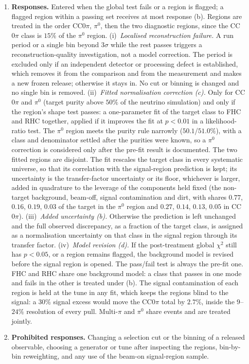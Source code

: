 \documentclass[11pt,a4paper]{article}
\begin{document}
\begin{enumerate}
    beyond $3\sigma$ with a passing total is examined for a reconstruction pathology but does not flag the
    region.
  \item \textbf{Responses.} Entered when the global test fails or a region is flagged; a flagged region
    within a passing set receives at most response (b). Regions are treated in the order CC$0\pi$,
    $\pi^0$, then the two diagnostic regions, since the CC$0\pi$ class is $15\%$ of the $\pi^0$ region.
    (i)~\emph{Localised reconstruction failure.} A run period or a single bin beyond $3\sigma$ while the
    rest passes triggers a reconstruction-quality investigation, not a model correction. The period is
    excluded only if an independent detector or processing defect is established, which removes it from
    the comparison and from the measurement and makes a new frozen release; otherwise it stays in. No cut
    or binning is changed and no single bin is removed.
    (ii)~\emph{Fitted normalisation correction (c).} Only for CC$0\pi$ and $\pi^0$ (target purity above
    $50\%$ of the neutrino simulation) and only if the region's shape test passes: a one-parameter fit of
    the target class to FHC and RHC together, applied if it improves the fit at $p<0.01$ in a
    likelihood-ratio test. The $\pi^0$ region meets the purity rule narrowly ($50.1$/$51.0\%$), with a
    class and denominator settled after the purities were known, so a $\pi^0$ correction is considered only
    after the pre-fit result is documented. The two fitted regions are disjoint. The fit rescales the
    target class in every systematic universe, so that its correlation with the signal-region prediction
    is kept; its uncertainty is the transfer-factor uncertainty or its floor, whichever is larger, added in
    quadrature to the leverage of the components held fixed (the non-target background, beam-off, signal
    contamination and dirt, with shares $0.77$, $0.16$, $0.19$, $0.03$ of the target in the $\pi^0$ region and
    $0.27$, $0.14$, $0.13$, $0.05$ in CC$0\pi$).
    (iii)~\emph{Added uncertainty (b).} Otherwise the prediction is left unchanged and the full observed
    discrepancy, as a fraction of the target class, is assigned as a normalisation uncertainty on that
    class in the signal region through its transfer factor.
    (iv)~\emph{Model revision (d).} If the post-treatment global $\chi^2$ still has $p<0.05$, or a region
    remains flagged, the background model is revised before the signal region is opened. The pass/fail
    test is always the pre-fit one.
    FHC and RHC share one background model: a class that passes in one mode and fails in the other is
    treated under (b). The signal contamination of each region is held at the tune in any fit, which keeps
    the regions blind to the signal: a $30\%$ signal excess would move the CC$0\pi$ total by $2.7\%$, inside
    the $9$--$24\%$ resolution of every pull. Multi-$\pi$ and $\pi^0$ share events and are treated jointly.
  \item \textbf{Prohibited responses.} Changing a selection cut or the binning of a released observable,
    choosing a generator or tune after inspecting the regions, bin-by-bin reweighting, and any use of the
    beam-on signal-region sample.
\end{enumerate}
\end{document}
